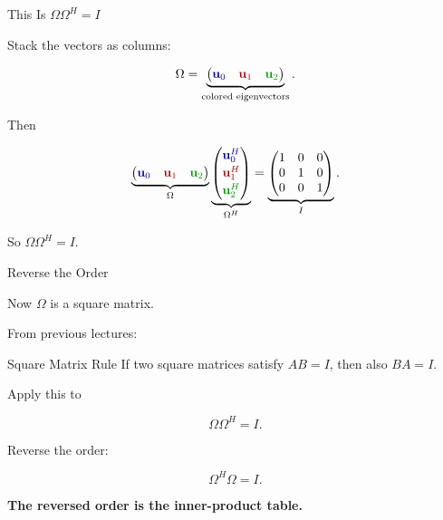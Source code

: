\documentclass[10pt]{beamer}
\theoremstyle{definition}
\newcommand{\x}[1]{\alert{\textbf{#1}}}
\newcommand{\rd}[1]{{\color{red!70!black}#1}}
\newcommand{\bl}[1]{{\color{blue!70!black}#1}}
\newcommand{\gn}[1]{{\color{green!60!black}#1}}
\begin{document}
\begin{frame}{This Is $\Omega\Omega^H=I$}

Stack the vectors as columns:

$$
\Omega=
\underbrace{
\begin{pmatrix}
\bl{\mathbf{u}_0}&\rd{\mathbf{u}_1}&\gn{\mathbf{u}_2}
\end{pmatrix}
}_{\text{colored eigenvectors}}.
$$

\vfill\pause

Then

$$
\underbrace{
\begin{pmatrix}
\bl{\mathbf{u}_0}&\rd{\mathbf{u}_1}&\gn{\mathbf{u}_2}
\end{pmatrix}
}_{\Omega}
\underbrace{
\begin{pmatrix}
\bl{\mathbf{u}_0^H}\\[2pt]
\rd{\mathbf{u}_1^H}\\[2pt]
\gn{\mathbf{u}_2^H}
\end{pmatrix}
}_{\Omega^H}
=
\underbrace{
\begin{pmatrix}
1&0&0\\
0&1&0\\
0&0&1
\end{pmatrix}
}_{I}.
$$

\vfill

So $\Omega\Omega^H=I$.

\end{frame}


\begin{frame}{Reverse the Order}

Now $\Omega$ is a square matrix.

\vfill

From previous lectures:

\begin{block}{Square Matrix Rule}
If two square matrices satisfy $AB=I$, then also $BA=I$.
\end{block}

\vfill\pause

Apply this to

$$
\Omega\Omega^H=I.
$$

\vfill

Reverse the order:

$$
\Omega^H\Omega=I.
$$

\vfill

\x{The reversed order is the inner-product table.}

\end{frame}
\end{document}
